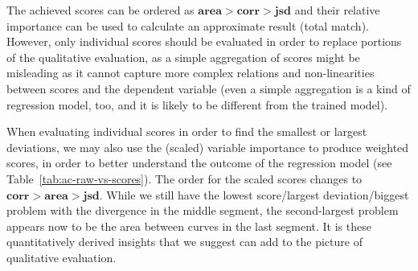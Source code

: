 The achieved scores can be ordered as $\mathbf{area}>\mathbf{corr}>\mathbf{jsd}$ and their relative importance can be used to calculate an approximate result (total match).
However, only individual scores should be evaluated in order to replace portions of the qualitative evaluation, as a simple aggregation of scores might be misleading as it cannot capture more complex relations and non-linearities between scores and the dependent variable (even a simple aggregation is a kind of regression model, too, and it is likely to be different from the trained model).

When evaluating individual scores in order to find the smallest or largest deviations, we may also use the (scaled) variable importance to produce weighted scores, in order to better understand the outcome of the regression model (see Table~\ref{tab:ac-raw-vs-scores}).
The order for the scaled scores changes to $\mathbf{corr}>\mathbf{area}>\mathbf{jsd}$.
While we still have the lowest score/largest deviation/biggest problem with the divergence in the middle segment, the second-largest problem appears now to be the area between curves in the last segment.
It is these quantitatively derived insights that we suggest can add to the picture of qualitative evaluation.

